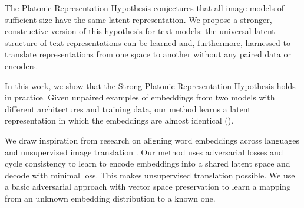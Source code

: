 

The Platonic Representation Hypothesis \citep{huh2024platonicrepresentationhypothesis} conjectures that all image models of sufficient size have the same latent representation.  We propose a stronger, constructive version of this hypothesis for text models: the universal latent structure of text representations can be learned and, furthermore, harnessed to translate representations from one space to another without any paired data or encoders.

In this work, we show that the Strong Platonic Representation Hypothesis holds in practice.  Given unpaired examples of embeddings from two models with different architectures and training data, our method learns a latent representation in which the embeddings are almost identical ().

We draw inspiration from research on aligning word embeddings across languages \citep{xing2015normalized, conneau2018wordtranslationparalleldata, grave2018unsupervisedalignmentembeddingswasserstein, chen2018unsupervisedmultilingualwordembeddings} and unsupervised image translation
\citep{liu2018unsupervisedimagetoimagetranslationnetworks,zhu2020unpairedimagetoimagetranslationusing}. Our \atk{} method uses adversarial losses and cycle consistency to learn to encode embeddings into a shared latent space and decode with minimal loss.  This makes unsupervised translation possible.  We use a basic adversarial approach with vector space preservation \citep{mrksic2016counterfittingwordvectorslinguistic} to learn a mapping from an unknown embedding distribution to a known one.


